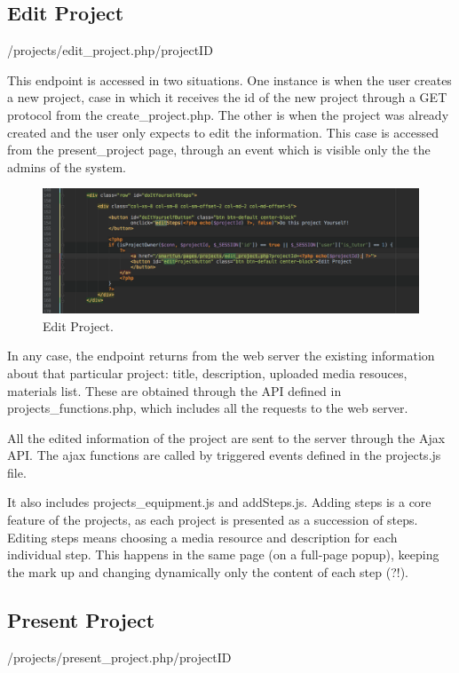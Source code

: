 \subsection{Edit Project}
/projects/edit\_project.php/{projectID}

This endpoint is accessed in two situations. One instance is when the user creates a new project, case in which it receives the id of the new project through a GET protocol from the create\_project.php. The other is when the project was already created and the user only expects to edit the information. This case is accessed from the present\_project page, through an event which is visible only the the admins of the system.

\begin{figure}
\includegraphics[width=1\linewidth]{images/edit.png}
\caption{Edit Project.}
\label{fig:edit_project.}
\end{figure}	

In any case, the endpoint returns from the web server the existing information about that particular project: title, description, uploaded media resouces, materials list. These are obtained through the API defined in projects\_functions.php, which includes all the requests to the web server.	

All the edited information of the project are sent to the server through the Ajax API. The ajax functions are called by triggered events defined in the projects.js file. 

It also includes projects\_equipment.js and addSteps.js. Adding steps is a core feature of the projects, as each project is presented as a succession of steps. Editing steps means choosing a media resource and description for each individual step. This happens in the same page (on a full-page popup), keeping the mark up and changing dynamically only the content of each step (?!).

 \subsection{Present Project}
/projects/present\_project.php/{projectID}

